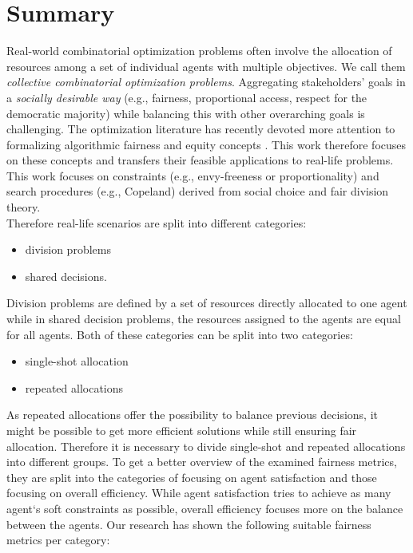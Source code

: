 \documentclass[german, a4paper, 11pt, oneside]{scrbook}
\begin{document}
\chapter{Summary}
Real-world combinatorial optimization problems often involve the allocation of resources among a set of individual agents with multiple objectives.
We call them \emph{collective combinatorial optimization problems}. 
Aggregating stakeholders' goals in a \emph{socially desirable way} (e.g., fairness, proportional access, respect for the democratic majority) while balancing this with other overarching goals is challenging. The optimization literature has recently devoted more attention to formalizing algorithmic fairness and equity concepts \cite{XinyingChen.2023}. This work therefore focuses on these concepts and transfers their feasible applications to real-life problems. This work focuses on constraints (e.g., envy-freeness or proportionality) and search procedures (e.g., Copeland) derived from social choice and fair division theory. \\Therefore real-life scenarios are split into different categories: 
 \begin{itemize}
\item division problems 
\item shared decisions. 
\end{itemize}
Division problems are defined by a set of resources directly allocated to one agent while in shared decision problems, the resources assigned to the agents are equal for all agents. Both of these categories can be split into two categories:
\begin{itemize}
\item single-shot allocation
\item repeated allocations
\end{itemize} 
As repeated allocations offer the possibility to balance previous decisions, it might be possible to get more efficient solutions while still ensuring fair allocation. Therefore it is necessary to divide single-shot and repeated allocations into different groups. To get a better overview of the examined fairness metrics, they are split into the categories of focusing on agent satisfaction and those focusing on overall efficiency. While agent satisfaction tries to achieve as many agent`s soft constraints as possible, overall efficiency focuses more on the balance between the agents.
Our research has shown the following suitable fairness metrics per category:
\\\\
\end{document}
